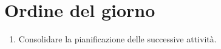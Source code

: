 \section{Ordine del giorno}

\begin{enumerate}
    \item Consolidare la pianificazione delle successive attività.
\end{enumerate}